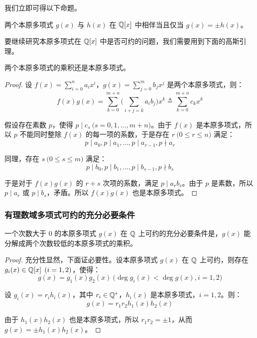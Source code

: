 我们立即可得以下命题。

\begin{proposition}
	两个本原多项式 $g(x)$ 与 $h(x)$ 在 $\mathbb Q[x]$ 中相伴当且仅当 $g(x) = \pm h(x)$。
\end{proposition}

要继续研究本原多项式在 $\mathbb Q[x]$ 中是否可约的问题，我们需要用到下面的高斯引理。

\begin{proposition}[高斯引理]
	两个本原多项式的乘积还是本原多项式。
\end{proposition}

\begin{proof}
	设 $f(x) = \sum\limits_{i = 0}^n a_i x^i$，$g(x) = \sum\limits_{j = 0}^m b_j x^j$ 是两个本原多项式，则：
	$$
	f(x) g(x) = \sum\limits_{k = 0}^{m + n} \biggl( \sum\limits_{i + j = k} a_i b_j \biggr) x^k \triangleq \sum\limits_{k = 0}^{m + n} c_k x^k
	$$

	假设存在素数 $p$，使得 $p \mid c_s \pod{s = 0, 1, \ldots, m + n}$。由于 $f(x)$ 是本原多项式，所以 $p$ 不能同时整除 $f(x)$ 的每一项的系数，于是存在 $r \pod{0 \le r \le n}$ 满足：
	$$
	p \mid a_0, p \mid a_1, \ldots, p \mid a_{r - 1}, p \nmid a_r
	$$

	同理，存在 $s \pod{0 \le s \le m}$ 满足：
	$$
	p \mid b_0, p \mid b_1, \ldots, p \mid b_{s - 1}, p \nmid b_s
	$$

	于是对于 $f(x) g(x)$ 的 $r + s$ 次项的系数，满足 $p \mid a_r b_s$。由于 $p$ 是素数，所以 $p \mid a_r$ 或 $p \mid b_s$，矛盾。所以 $f(x) g(x)$ 也是本原多项式。
\end{proof}

\subsubsection{有理数域多项式可约的充分必要条件}

\begin{proposition}
	一个次数大于 $0$ 的本原多项式 $g(x)$ 在 $\mathbb Q$ 上可约的充分必要条件是，$g(x)$ 能分解成两个次数较低的本原多项式的乘积。
\end{proposition}

\begin{proof}
	充分性显然，下面证必要性。设本原多项式 $g(x)$ 在 $\mathbb Q$ 上可约，则存在 $g_i(x) \in \mathbb Q[x] \pod{i = 1, 2}$，使得：
	$$
	g(x) = g_1(x) g_2(x) \pod{\deg g_i(x) < \deg g(x), i = 1, 2}
	$$

	设 $g_i(x) = r_i h_i(x)$，其中 $r_i \in \mathbb Q^*$，$h_i(x)$ 是本原多项式，$i = 1, 2$。则：
	$$
	g(x) = r_1 r_2 h_1(x) h_2(x)
	$$

	由于 $h_1(x) h_2(x)$ 也是本原多项式，所以 $r_1 r_2 = \pm 1$，从而 $g(x) = \pm h_1(x) h_2(x)$。
\end{proof}


